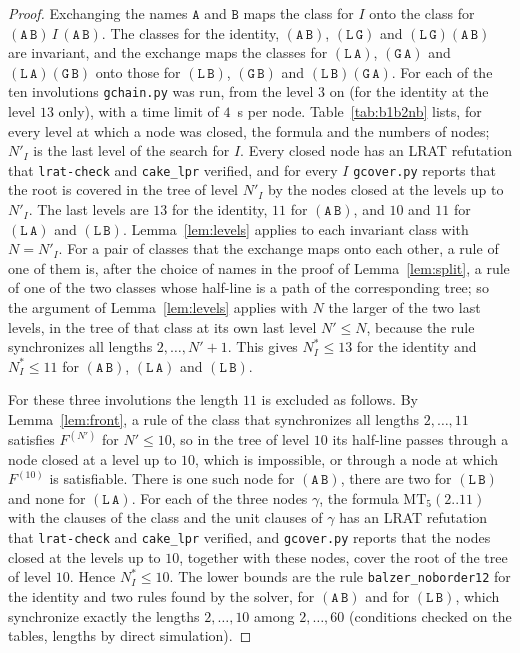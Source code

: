 \documentclass[11pt]{article}
\theoremstyle{remark}
\newcommand{\Lq}{\mathtt{L}}\newcommand{\Gq}{\mathtt{G}}\newcommand{\Aq}{\mathtt{A}}\newcommand{\Bq}{\mathtt{B}}\newcommand{\Fq}{\mathtt{F}}
\newcommand{\MT}{\mathrm{MT}}
\begin{document}
\begin{proof}
Exchanging the names $\Aq$ and $\Bq$ maps the class for $I$ onto the class for
$(\Aq\,\Bq)\,I\,(\Aq\,\Bq)$. The classes for the identity, $(\Aq\,\Bq)$, $(\Lq\,\Gq)$ and
$(\Lq\,\Gq)(\Aq\,\Bq)$ are invariant, and the exchange maps the classes for $(\Lq\,\Aq)$, $(\Gq\,\Aq)$ and
$(\Lq\,\Aq)(\Gq\,\Bq)$ onto those for $(\Lq\,\Bq)$, $(\Gq\,\Bq)$ and $(\Lq\,\Bq)(\Gq\,\Aq)$. For each of the ten
involutions \texttt{gchain.py} was run, from the level $3$ on (for the identity at the level $13$ only), with
a time limit of $4$~s per node. Table~\ref{tab:b1b2nb} lists, for every level at which a node was closed, the
formula and the numbers of nodes; $N'_I$ is the last level of the search for $I$. Every closed node has an
LRAT refutation that \texttt{lrat-check} and \texttt{cake\_lpr} verified, and for every $I$
\texttt{gcover.py} reports that the root is covered in the tree of level $N'_I$ by the nodes closed at the
levels up to $N'_I$. The last levels are $13$ for the identity, $11$ for $(\Aq\,\Bq)$, and $10$ and $11$ for
$(\Lq\,\Aq)$ and $(\Lq\,\Bq)$. Lemma~\ref{lem:levels} applies to each invariant class with $N=N'_I$. For a
pair of classes that the exchange maps onto each other, a rule of one of them is, after the choice of names in
the proof of Lemma~\ref{lem:split}, a rule of one of the two classes whose half-line is a path of the
corresponding tree; so the argument of Lemma~\ref{lem:levels} applies with $N$ the larger of the two last
levels, in the tree of that class at its own last level $N'\le N$, because the rule synchronizes all lengths
$2,\dots,N'+1$. This gives $N^\ast_I\le13$ for the identity and $N^\ast_I\le11$ for $(\Aq\,\Bq)$,
$(\Lq\,\Aq)$ and $(\Lq\,\Bq)$.

For these three involutions the length $11$ is excluded as follows. By Lemma~\ref{lem:front}, a rule of the
class that synchronizes all lengths $2,\dots,11$ satisfies $F^{(N')}$ for $N'\le10$, so in the tree of level
$10$ its half-line passes through a node closed at a level up to $10$, which is impossible, or through a node
at which $F^{(10)}$ is satisfiable. There is one such node for $(\Aq\,\Bq)$, there are two for $(\Lq\,\Bq)$ and
none for $(\Lq\,\Aq)$. For each of the three nodes $\gamma$, the formula $\MT_5(2..11)$ with the clauses of the
class and the unit clauses of $\gamma$ has an LRAT refutation that \texttt{lrat-check} and \texttt{cake\_lpr}
verified, and \texttt{gcover.py} reports that the nodes closed at the levels up to $10$, together with these
nodes, cover the root of the tree of level $10$. Hence $N^\ast_I\le10$. The lower bounds are the rule \texttt{balzer\_noborder12} for the identity and
two rules found by the solver, for $(\Aq\,\Bq)$ and for $(\Lq\,\Bq)$, which synchronize exactly the lengths
$2,\dots,10$ among $2,\dots,60$ (conditions checked on the tables, lengths by direct simulation).


\end{proof}
\end{document}
